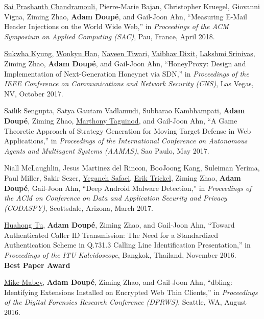\documentclass[11pt,letterpaper,sans]{moderncv}
\begin{document}
\begin{etaremune}
\item \underline{Sai Prashanth Chandramouli}, Pierre-Marie Bajan,
  Christopher Kruegel, Giovanni Vigna, Ziming Zhao, \textbf{Adam Doup\'e}, and
  Gail-Joon Ahn, ``Measuring E-Mail Header Injections on the World
  Wide Web,'' in \emph{Proceedings of the ACM Symposium on Applied
    Computing (SAC)}, Pau, France, April 2018.

\item \underline{Sukwha Kyung}, \underline{Wonkyu Han},
  \underline{Naveen Tiwari}, \underline{Vaibhav Dixit},
  \underline{Lakshmi Srinivas}, Ziming Zhao, \textbf{Adam Doup\'e}, and
  Gail-Joon Ahn, ``HoneyProxy: Design and Implementation of
  Next-Generation Honeynet via SDN,'' in \emph{Proceedings of the IEEE
    Conference on Communications and Network Security (CNS)}, Las
  Vegas, NV, October 2017. 

\item Sailik Sengupta, Satya Gautam Vadlamudi, Subbarao Kambhampati,
  \textbf{Adam Doup\'e}, Ziming Zhao, \underline{Marthony Taguinod},
  and Gail-Joon Ahn, ``A Game Theoretic Approach of Strategy
  Generation for Moving Target Defense in Web Applications,'' in
  \emph{Proceedings of the International Conference on Autonomous Agents
    and Multiagent Systems (AAMAS)}, Sao Paulo, May 2017.

\item Niall McLaughlin, Jesus Martinez del Rincon, BooJoong Kang,
  Suleiman Yerima, Paul Miller, Sakir Sezer, \underline{Yeganeh
    Safaei}, \underline{Erik Trickel}, Ziming Zhao, \textbf{Adam
    Doup\'e}, Gail-Joon Ahn, ``Deep Android Malware Detection,'' in
  \emph{Proceedings of the ACM on Conference on Data and Application
    Security and Privacy (CODASPY)}, Scottsdale, Arizona, March 2017.

\item \underline{Huahong Tu}, \textbf{Adam Doup\'e}, Ziming Zhao, and
  Gail-Joon Ahn, ``Toward Authenticated Caller ID Transmission: The
  Need for a Standardized Authentication Scheme in Q.731.3 Calling
  Line Identification Presentation,'' in \emph{Proceedings of the ITU
    Kaleidoscope}, Bangkok, Thailand, November 2016. \\
  \textbf{Best Paper Award}

\item \underline{Mike Mabey}, \textbf{Adam Doup\'e}, Ziming Zhao, and
  Gail-Joon Ahn, ``dbling: Identifying Extensions Installed on
  Encrypted Web Thin Clients,'' in \emph{Proceedings of the Digital
    Forensics Research Conference (DFRWS)}, Seattle, WA, August 2016.


\end{etaremune}
\end{document}
